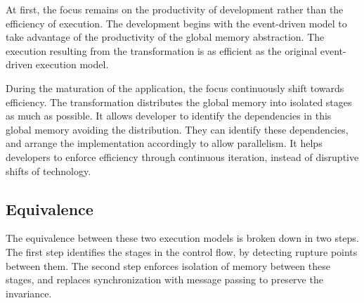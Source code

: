 




At first, the focus remains on the productivity of development rather than the efficiency of execution.
The development begins with the event-driven model to take advantage of the productivity of the global memory abstraction.
The execution resulting from the transformation is as efficient as the original event-driven execution model.

During the maturation of the application, the focus continuously shift towards efficiency.
The transformation distributes the global memory into isolated stages as much as possible.
It allows developer to identify the dependencies in this global memory avoiding the distribution.
They can identify these dependencies, and arrange the implementation accordingly to allow parallelism.
It helps developers to enforce efficiency through continuous iteration, instead of disruptive shifts of technology.




\subsection{Equivalence} \label{chapter4:equivalence}

The equivalence between these two execution models is broken down in two steps. %
The first step identifies the stages in the control flow, by detecting rupture points between them.
The second step enforces isolation of memory between these stages, and replaces synchronization with message passing to preserve the invariance.

